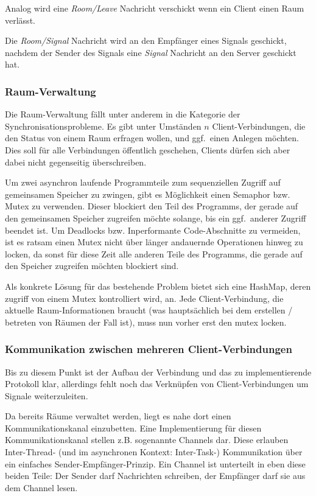 \documentclass[journal]{IEEEtran}
\begin{document}
\begin{twocolumn}
Analog wird eine \textit{Room/Leave} Nachricht verschickt wenn ein Client einen
Raum verlässt.

Die \textit{Room/Signal} Nachricht wird an den Empfänger eines Signals
geschickt, nachdem der Sender des Signals eine \textit{Signal} Nachricht an den
Server geschickt hat.

\subsubsection{Raum-Verwaltung}

Die Raum-Verwaltung fällt unter anderem in die Kategorie der
Synchronisationsprobleme. Es gibt unter Umständen $n$ Client-Verbindungen, die
den Status von einem Raum erfragen wollen, und ggf.\ einen Anlegen möchten. Dies
soll für alle Verbindungen öffentlich geschehen, Clients dürfen sich aber dabei
nicht gegenseitig überschreiben.


Um zwei asynchron laufende Programmteile zum sequenziellen Zugriff auf
gemeinsamen Speicher zu zwingen, gibt es Möglichkeit einen Semaphor bzw. Mutex
zu verwenden. Dieser blockiert den Teil des Programms, der gerade auf den
gemeinsamen Speicher zugreifen möchte solange, bis ein ggf.\ anderer Zugriff
beendet ist. Um Deadlocks bzw. Inperformante Code-Abschnitte zu vermeiden, ist
es ratsam einen Mutex nicht über länger andauernde Operationen hinweg zu
locken, da sonst für diese Zeit alle anderen Teile des Programms, die gerade
auf den Speicher zugreifen möchten blockiert sind.

Als konkrete Lösung für das bestehende Problem bietet sich eine HashMap, deren
zugriff von einem Mutex kontrolliert wird, an. Jede Client-Verbindung, die
aktuelle Raum-Informationen braucht (was hauptsächlich bei dem erstellen /
betreten von Räumen der Fall ist), muss nun vorher erst den mutex locken. 

\subsubsection{Kommunikation zwischen mehreren Client-Verbindungen}

Bis zu diesem Punkt ist der Aufbau der Verbindung und das zu implementierende
Protokoll klar, allerdings fehlt noch das Verknüpfen von Client-Verbindungen um
Signale weiterzuleiten.

Da bereits Räume verwaltet werden, liegt es nahe dort einen Kommunikationskanal
einzubetten. Eine Implementierung für diesen Kommunikationskanal stellen z.B.
sogenannte Channels dar. Diese erlauben Inter-Thread- (und im asynchronen
Kontext: Inter-Task-) Kommunikation über ein einfaches
Sender-Empfänger-Prinzip. Ein Channel ist unterteilt in eben diese beiden
Teile: Der Sender darf Nachrichten schreiben, der Empfänger darf sie aus dem
Channel lesen.


\end{twocolumn}
\end{document}
